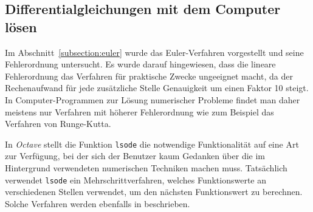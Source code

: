 %
%
%
\subsection{Differentialgleichungen mit dem Computer lösen\label{section:octave}}
Im Abschnitt~\ref{subsection:euler} wurde das Euler-Verfahren
vorgestellt und seine Fehlerordnung untersucht.
Es wurde darauf hingewiesen, dass die lineare Fehlerordnung das Verfahren
für praktische Zwecke ungeeignet macht, da der Rechenaufwand für jede
zusätzliche Stelle Genauigkeit um einen Faktor 10 steigt.
In Computer-Programmen zur Lösung numerischer Probleme findet man daher
meistens nur Verfahren mit höherer Fehlerordnung wie zum Beispiel
das Verfahren von Runge-Kutta.

In {\em Octave} stellt die Funktion \texttt{lsode} die notwendige
%
Funktionalität auf eine Art zur Verfügung, bei der sich der
Benutzer kaum Gedanken über die im Hintergrund verwendeten
numerischen Techniken machen muss.
Tatsächlich verwendet \texttt{lsode} ein Mehrschrittverfahren, welches
Funktionswerte an verschiedenen Stellen verwendet, um den nächsten
Funktionswert zu berechnen.
Solche Verfahren werden ebenfalls in \cite{skript:mathsem-dgl} beschrieben.

